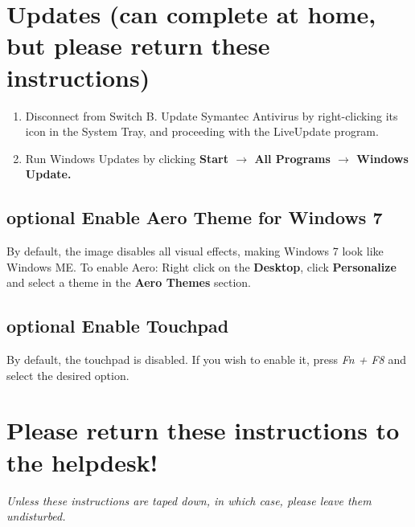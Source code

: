 \documentclass[10pt]{article}
\begin{document}
\section{Updates (can complete at home, but please return these instructions)}
\begin{enumerate}
\item Disconnect from Switch B. Update Symantec Antivirus by right-clicking its icon in the System Tray, and proceeding with the LiveUpdate program.
\item Run Windows Updates by clicking {\bf Start $\rightarrow$ All Programs $\rightarrow$ Windows Update.}
\end{enumerate}
\subsection{{\sc optional} Enable Aero Theme for Windows 7}
By default, the image disables all visual effects, making Windows 7 look like Windows ME. To enable Aero:
Right click on the {\bf Desktop}, click {\bf Personalize} and select a theme in the {\bf Aero Themes} section.
\subsection{{\sc optional} Enable Touchpad}
By default, the touchpad is disabled. If you wish to enable it, press \emph{Fn + F8} and select the desired option.
\section{Please return these instructions to the helpdesk!}
\emph{Unless these instructions are taped down, in which case, please leave them undisturbed.}
\end{document}
